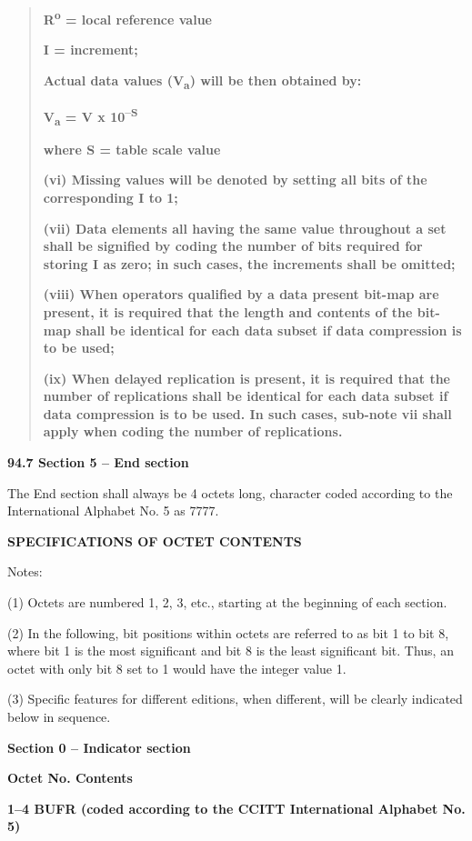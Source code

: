 \begin{quote}
\textbf{R\textsuperscript{o} = local reference value}

\textbf{I = increment;}

\textbf{Actual data values (V\textsubscript{a}) will be then obtained by:}

\textbf{V\textsubscript{a} = V x 10\textsuperscript{--S}}

\textbf{where S = table scale value}

\textbf{(vi) Missing values will be denoted by setting all bits of the corresponding I to 1;}

\textbf{(vii) Data elements all having the same value throughout a set shall be signified by coding the number of bits required for storing I as zero; in such cases, the increments shall be omitted;}

\textbf{(viii) When operators qualified by a data present bit-map are present, it is required that the length and contents of the bit-map shall be identical for each data subset if data compression is to be used;}

\textbf{(ix) When delayed replication is present, it is required that the number of replications shall be identical for each data subset if data compression is to be used. In such cases, sub-note vii shall apply when coding the number of replications.}
\end{quote}

\textbf{94.7 Section 5 -- End section}

The End section shall always be 4 octets long, character coded according to the International Alphabet No. 5 as 7777.

\textbf{SPECIFICATIONS OF OCTET CONTENTS}

Notes:

(1) Octets are numbered 1, 2, 3, etc., starting at the beginning of each section.

(2) In the following, bit positions within octets are referred to as bit 1 to bit 8, where bit 1 is the most significant and bit 8 is the least significant bit. Thus, an octet with only bit 8 set to 1 would have the integer value 1.

(3) Specific features for different editions, when different, will be clearly indicated below in sequence.

\textbf{Section 0 -- Indicator section}

\textbf{Octet No. Contents}

\textbf{1--4 BUFR (coded according to the CCITT International Alphabet No. 5)}

